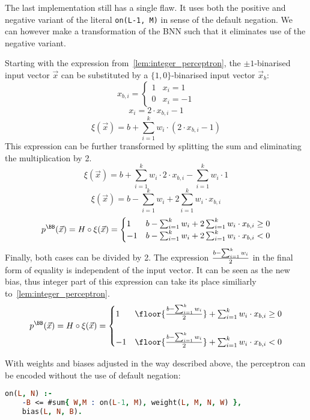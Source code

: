 
The last implementation still has a single flaw. It uses both the positive
and negative variant of the literal \texttt{on(L-1, M)} in sense of the default
negation. We can however make a transformation of the BNN such that it eliminates
use of the negative variant.%
\label{sec:01-mapping}

Starting with the expression from~\ref{lem:integer_perceptron}, the $\pm 1$-binarised
input vector $\vec x$ can be substituted by a $\{1,0\}$-binarised input vector
$\vec x_b$:
\[x_{b,i} = \begin{cases}
    1 & x_i = 1\\
    0 & x_i = -1
\end{cases}\]
\[x_i = 2\cdot x_{b,i} - 1\]
\[\xi(\vec x) = b + \sum_{i=1}^k w_i\cdot (2\cdot x_{b,i} - 1)\]
This expression can be further transformed by splitting the sum and eliminating
the multiplication by 2.
\[\xi(\vec x) = b + \sum_{i=1}^k w_i\cdot 2 \cdot x_{b,i} - \sum_{i=1}^k w_i\cdot 1\]
\[\xi(\vec x) = b - \sum_{i=1}^k w_i + 2\sum_{i=1}^k w_i \cdot x_{b,i}\]
\[p^\BB(\vec x) = H \circ \xi (\vec x) = \begin{cases}
    1 & b - \sum_{i=1}^k w_i + 2\sum_{i=1}^k w_i \cdot x_{b,i} \geq 0\\
    -1 & b - \sum_{i=1}^k w_i + 2\sum_{i=1}^k w_i \cdot x_{b,i} < 0
\end{cases}\]
Finally, both cases can be divided by 2. The expression $b-\sum_{i=1}^k w_i\over 2$
in the final form of equality is independent of the input vector.
It can be seen as the new bias, thus integer part of this expression can take its
place similiarly to~\cref{lem:integer_perceptron}.
\[p^\BB(\vec x) = H \circ \xi (\vec x) = \begin{cases}
    1 & \floor{{b - \sum_{i=1}^k w_i \over 2}} + \sum_{i=1}^k w_i \cdot x_{b,i} \geq 0\\
    {} & {}\\
    -1 & \floor{{b - \sum_{i=1}^k w_i \over 2}} + \sum_{i=1}^k w_i \cdot x_{b,i} < 0
\end{cases}\]

With weights and biases adjusted in the way described above, the perceptron can be
encoded without the use of default negation:

\begin{code}
\begin{lstlisting}[language=Prolog, numbers=none]
on(L, N) :-
    -B <= #sum{ W,M : on(L-1, M), weight(L, M, N, W) },
    bias(L, N, B).
\end{lstlisting}
    \nobreak{}\label{enc:perc_direct_01}
\end{code}


